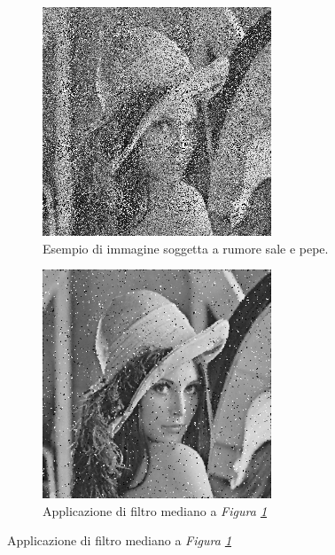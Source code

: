 \documentclass{subfiles}
\begin{document}
\begin{figure}[!h]
    \centering
    \begin{subfigure}{0.45\textwidth}
        \centering
        \includegraphics[width = 0.75\textwidth]{../Other/Lena/Lena with salt-pepper noise.png}
        \caption{Esempio di immagine soggetta a rumore sale e pepe.}
        \label{fig:3.3.1}
    \end{subfigure}
    \hspace{15pt}
    \begin{subfigure}{0.45\textwidth}
        \centering
        \includegraphics[width = 0.75\textwidth]{../Other/Lena/Median filter applied to noisy Lena.png}
        \caption{Applicazione di filtro mediano a \emph{Figura \ref{fig:3.3.1}}}
    \end{subfigure}
\end{figure}
\end{document}
